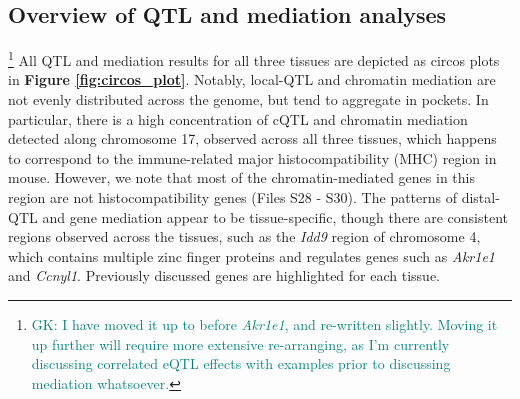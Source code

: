 \documentclass[9pt,twocolumn,twoside]{gsajnl}
\newcommand{\ie}{\emph{i.e.}\xspace}
\newcommand{\WVinline}[1]{\textcolor{red}{#1}}
\newcommand{\GK}[2]{\textcolor{teal}{#1\footnote{\textcolor{teal}{GK: #2}}}}
\begin{document}
\subsection{Overview of QTL and mediation analyses}\GK{}{I have moved it up to before \textit{Akr1e1}, and re-written slightly. Moving it up further will require more extensive re-arranging, as I'm currently discussing correlated eQTL effects with examples prior to discussing mediation whatsoever.}
All QTL and mediation results for all three tissues are depicted as circos plots \citep{Gu2014} in \textbf{Figure \ref{fig:circos_plot}}. Notably, local-QTL and chromatin mediation are not evenly distributed across the genome, but tend to aggregate in pockets. In particular, there is a high concentration of cQTL and chromatin mediation detected along chromosome 17, observed across all three tissues, which happens to correspond to the immune-related major histocompatibility (MHC) region in mouse. However, we note that most of the chromatin-mediated genes in this region are not histocompatibility genes (Files S28 - S30). The patterns of distal-QTL and gene mediation appear to be tissue-specific, though there are consistent regions observed across the tissues, such as the \textit{Idd9} region \citep{HamiltonWilliams2010} of chromosome 4, which contains multiple zinc finger proteins and regulates genes such as \textit{Akr1e1} and \textit{Ccnyl1}. Previously discussed genes are highlighted for each tissue.
\end{document}
